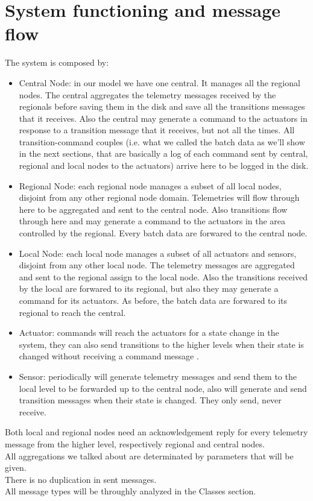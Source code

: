 \documentclass[11pt]{article}
\begin{document}
\section{System functioning and message flow}
The system is composed by:
\begin{itemize}
    \item Central Node: in our model we have one central. It manages all the regional nodes. The central aggregates the telemetry messages received by the regionals before saving them in the disk and save all the transitions messages that it receives. Also the central may generate a command to the actuators in response to a transition message that it receives, but not all the times. All transition-command couples (i.e. what we called the batch data as we'll show in the next sections, that are basically a log of each command sent by central, regional and local nodes to the actuators) arrive here to be logged in the disk.
\item Regional Node: each regional node manages a subset of all local nodes, disjoint from any other regional node domain. Telemetries will flow through here to be aggregated and sent to the central node. Also transitions flow through here and may generate a command to the actuators in the area controlled by the regional. Every batch data are forwared to the central node.
\item Local Node: each local node manages a subset of all actuators and sensors, disjoint from any other local node. The telemetry messages are aggregated and sent to the regional assign to the local node. Also the transitions received by the local are forwared to its regional, but also they may generate a command for its actuators. As before, the batch data are forwared to its regional to reach the central.
\item Actuator: commands will reach the actuators for a state change in the system, they can also send transitions to the higher levels when their state is changed without receiving a command message .
\item Sensor: periodically will generate telemetry messages and send them to the local level to be forwarded up to the central node, also will generate and send transition messages when their state is changed. They only send, never receive.
\end{itemize}
Both local and regional nodes need an acknowledgement reply for every telemetry message from the higher level, respectively regional and central nodes. \\
All aggregations we talked about are determinated by parameters that will be given.\\
There is no duplication in sent messages.\\
All message types will be throughly analyzed in the Classes section.\\
\end{document}
